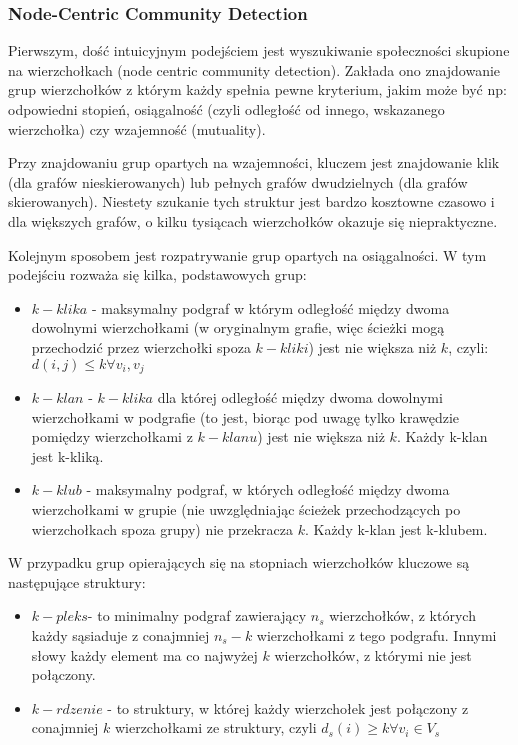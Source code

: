 \documentclass{article}
\begin{document}
\subsubsection{Node-Centric Community Detection}
Pierwszym, dość intuicyjnym podejściem jest wyszukiwanie społeczności skupione na wierzchołkach (node centric community detection). Zakłada ono znajdowanie grup wierzchołków z którym każdy spełnia pewne kryterium, jakim może być np: odpowiedni stopień, osiągalność (czyli odległość od innego, wskazanego wierzchołka) czy wzajemność (mutuality).

Przy znajdowaniu grup opartych na  wzajemności, kluczem jest znajdowanie klik (dla grafów nieskierowanych) lub pełnych grafów dwudzielnych (dla grafów skierowanych). Niestety szukanie tych struktur jest bardzo kosztowne czasowo i dla większych grafów, o kilku tysiącach wierzchołków okazuje się niepraktyczne.

Kolejnym sposobem jest rozpatrywanie grup opartych na osiągalności. W tym podejściu rozważa się kilka, podstawowych grup:

\begin{itemize}
\item $k-klika$ - maksymalny podgraf w którym odległość między dwoma dowolnymi wierzchołkami (w oryginalnym grafie, więc ścieżki mogą przechodzić przez wierzchołki spoza $k-kliki$) jest nie większa niż $k$, czyli: $d(i,j)\leq k  \forall v_i , v_j $
\item  $k-klan$ - $k-klika$ dla której odległość między dwoma dowolnymi wierzchołkami w podgrafie (to jest, biorąc pod uwagę tylko krawędzie pomiędzy wierzchołkami z $k-klanu$) jest nie większa niż $k$. Każdy k-klan jest k-kliką.
\item $k - klub$ - maksymalny podgraf, w których odległość między dwoma wierzchołkami w grupie (nie uwzględniając ścieżek przechodzących po wierzchołkach spoza grupy) nie przekracza $k$. Każdy k-klan jest k-klubem.
\end{itemize}

W przypadku grup opierających się na stopniach wierzchołków kluczowe są następujące struktury:

\begin{itemize}
\item $k - pleks $- to minimalny podgraf zawierający $n_s$ wierzchołków, z których każdy sąsiaduje z conajmniej $n_s - k$ wierzchołkami z tego podgrafu. Innymi słowy każdy element ma co najwyżej $k$ wierzchołków, z którymi nie jest połączony.
\item $k - rdzenie$ -  to struktury, w której każdy wierzchołek jest połączony z conajmniej $k$ wierzchołkami ze struktury, czyli  $d_s(i)\geq k \forall v_i \in V_s $
\end{itemize}
\end{document}
